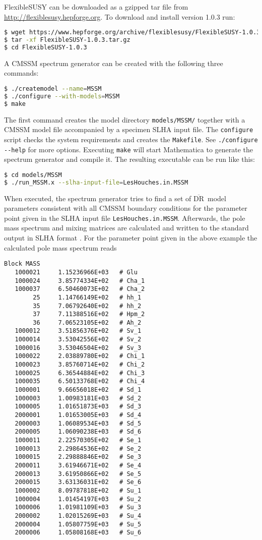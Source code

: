 \documentclass[final,3p,11pt,pdflatex]{elsarticle}
\makeatletter
\newcommand{\fs}{FlexibleSUSY\@\xspace}
\newcommand{\mathematica}{Mathematica\xspace}
\newcommand{\code}[1]{\lstinline|#1|}  %
\newcommand{\textoverline}[1]{$\overline{\mbox{#1}}$}
\newcommand{\DRbar}{\textoverline{DR}\xspace}
\makeatother
\begin{document}
\fs can be downloaded as a gzipped tar file from
\url{http://flexiblesusy.hepforge.org}.  To download and install
version 1.0.3 run:
%
\begin{lstlisting}[language=bash]
$ wget https://www.hepforge.org/archive/flexiblesusy/FlexibleSUSY-1.0.3.tar.gz
$ tar -xf FlexibleSUSY-1.0.3.tar.gz
$ cd FlexibleSUSY-1.0.3
\end{lstlisting}%
%
A CMSSM spectrum generator can be created with the following three
commands:
%
\begin{lstlisting}[language=bash]
$ ./createmodel --name=MSSM
$ ./configure --with-models=MSSM
$ make
\end{lstlisting}%
%
The first command creates the model directory \code{models/MSSM/}
together with a CMSSM model file accompanied by
a specimen SLHA input file.  The \code{configure} script checks
the system requirements and creates the \code{Makefile}.  See
\code{./configure --help} for more options.  Executing \code{make}
will start \mathematica to generate the spectrum generator and compile
it.  The resulting executable can be run like this:
%
\begin{lstlisting}[language=bash]
$ cd models/MSSM 
$ ./run_MSSM.x --slha-input-file=LesHouches.in.MSSM
\end{lstlisting}
%
When executed, the spectrum generator tries to find a set of \DRbar\
model parameters consistent with all CMSSM boundary conditions for the
parameter point given in the SLHA input file
\code{LesHouches.in.MSSM}.  Afterwards, the pole mass
spectrum and mixing matrices are calculated and written to the standard
output in SLHA format \cite{Skands:2003cj,Allanach:2008qq}.  For the
parameter point given in the above example the calculated pole mass
spectrum reads
%
\begin{lstlisting}
Block MASS
   1000021     1.15236966E+03   # Glu
   1000024     3.85774334E+02   # Cha_1
   1000037     6.50460073E+02   # Cha_2
        25     1.14766149E+02   # hh_1
        35     7.06792640E+02   # hh_2
        37     7.11388516E+02   # Hpm_2
        36     7.06523105E+02   # Ah_2
   1000012     3.51856376E+02   # Sv_1
   1000014     3.53042556E+02   # Sv_2
   1000016     3.53046504E+02   # Sv_3
   1000022     2.03889780E+02   # Chi_1
   1000023     3.85760714E+02   # Chi_2
   1000025     6.36544884E+02   # Chi_3
   1000035     6.50133768E+02   # Chi_4
   1000001     9.66656018E+02   # Sd_1
   1000003     1.00983181E+03   # Sd_2
   1000005     1.01651873E+03   # Sd_3
   2000001     1.01653005E+03   # Sd_4
   2000003     1.06089534E+03   # Sd_5
   2000005     1.06090238E+03   # Sd_6
   1000011     2.22570305E+02   # Se_1
   1000013     2.29864536E+02   # Se_2
   1000015     2.29888846E+02   # Se_3
   2000011     3.61946671E+02   # Se_4
   2000013     3.61950866E+02   # Se_5
   2000015     3.63136031E+02   # Se_6
   1000002     8.09787818E+02   # Su_1
   1000004     1.01454197E+03   # Su_2
   1000006     1.01981109E+03   # Su_3
   2000002     1.02015269E+03   # Su_4
   2000004     1.05807759E+03   # Su_5
   2000006     1.05808168E+03   # Su_6
\end{lstlisting}
\end{document}
